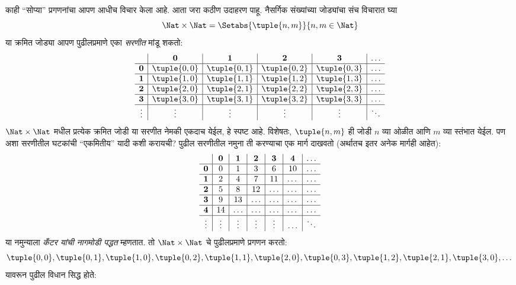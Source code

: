 \documentclass[../../../include/open-logic-section]{subfiles}
\begin{document}


\begin{explain}
काही ``सोप्या'' प्रगणनांचा आपण आधीच विचार केला आहे. आता जरा कठीण
उदाहरण पाहू. नैसर्गिक संख्यांच्या जोड्यांचा संच विचारात घ्या
\[
\Nat \times \Nat = \Setabs{\tuple{n,m}}{n,m \in \Nat}
\]
या क्रमित जोड्या आपण पुढीलप्रमाणे एका \emph{सरणीत} मांडू शकतो:
\[
\begin{array}{ c | c | c | c | c | c}
& \mathbf 0 & \mathbf 1 & \mathbf 2 & \mathbf 3 & \dots \\
\hline
\mathbf 0 & \tuple{0,0} & \tuple{0,1} & \tuple{0,2} & \tuple{0,3} & \dots \\
\hline
\mathbf 1 & \tuple{1,0} & \tuple{1,1} & \tuple{1,2} & \tuple{1,3} & \dots \\
\hline
\mathbf 2 & \tuple{2,0} & \tuple{2,1} & \tuple{2,2} & \tuple{2,3} & \dots \\
\hline
\mathbf 3 & \tuple{3,0} & \tuple{3,1} & \tuple{3,2} & \tuple{3,3} & \dots \\
\hline
\vdots & \vdots & \vdots & \vdots & \vdots & \ddots\\
\end{array}
\]
$\Nat \times \Nat$ मधील प्रत्येक क्रमित जोडी या सरणीत नेमकी एकदाच
येईल, हे स्पष्ट आहे. विशेषतः, $\tuple{n,m}$ ही जोडी $n$ व्या ओळीत
आणि $m$ व्या स्तंभात येईल. पण अशा सरणीतील घटकांची ``एकमितीय'' यादी
कशी करायची? पुढील सरणीतील नमुना ती करण्याचा एक मार्ग दाखवतो
(अर्थातच इतर अनेक मार्गही आहेत):
\[
\begin{array}{ c | c | c | c | c | c | c}
& \mathbf 0 & \mathbf 1 & \mathbf 2 & \mathbf 3 & \mathbf 4 &\dots \\
\hline
\mathbf 0 & 0  & 1& 3 & 6& 10 &\ldots \\
\hline
\mathbf 1 &2 & 4& 7 & 11 & \dots &\ldots \\
\hline
\mathbf 2 & 5 & 8 & 12 & \ldots & \dots&\ldots \\
\hline
\mathbf 3 & 9 & 13 & \ldots & \ldots & \dots & \ldots \\
\hline
\mathbf 4 & 14 & \ldots & \ldots & \ldots & \dots & \ldots \\
\hline
\vdots & \vdots & \vdots & \vdots & \vdots&\ldots & \ddots\\
\end{array}
\]\noindent
या नमुन्याला \emph{कँटर यांची नागमोडी पद्धत} म्हणतात. तो
$\Nat \times \Nat$ चे पुढीलप्रमाणे प्रगणन करतो:
\[
\tuple{0,0}, \tuple{0,1}, \tuple{1,0}, \tuple{0,2}, \tuple{1,1},
\tuple{2,0}, \tuple{0,3}, \tuple{1,2}, \tuple{2,1}, \tuple{3,0}, \dots
\]
यावरून पुढील विधान सिद्ध होते:
\end{explain}
\end{document}
